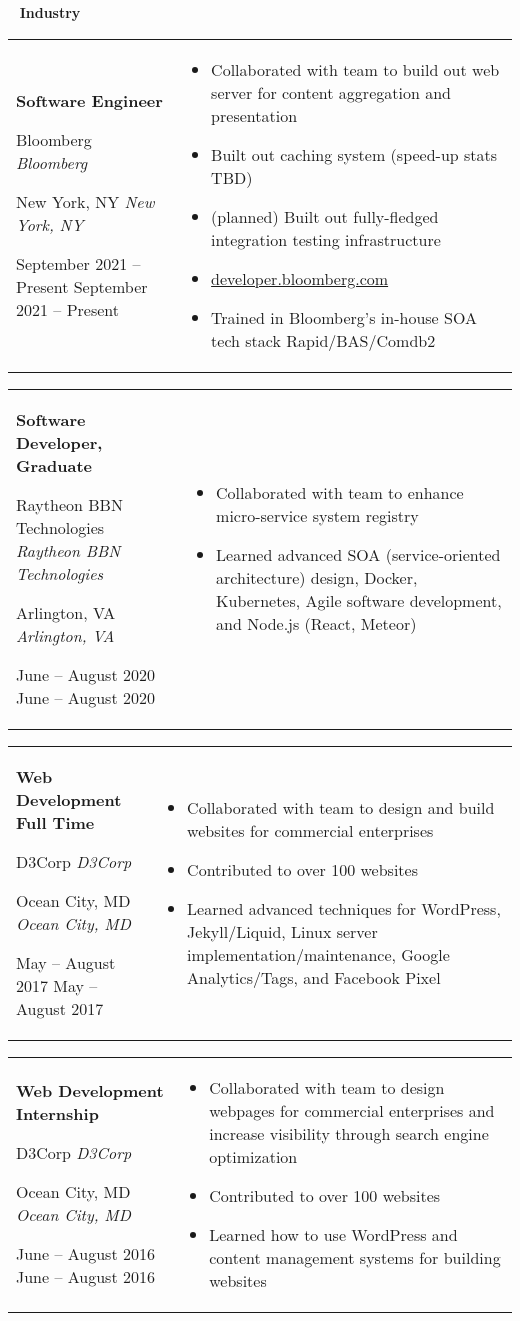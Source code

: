 \documentclass[11pt,letterpaper]{article}
\newcommand{\sect}[1]{
\begin{center}
	\noindent\xrfill[0.7ex]{0.5pt} \mbox{ } {\Large \bf #1} \mbox{ } \xrfill[0.7ex]{0.5pt}
\end{center}
}
\newcommand{\entry}[5]{
	\noindent
	\begin{tabular}{p{2in} p{\dimexpr \linewidth-2\tabcolsep-2.25in}} %
		\noindent \textbf{#1}
		
		\ifx #2  \else \noindent \textit{#2} \fi
		
		\ifx #3  \else \noindent \textit{#3} \fi
		
		\ifx #4  \else \noindent #4 \fi
		&
		#5
	\end{tabular}
	\vspace{0.5cm}
}
\begin{document}
	\pagebreak
	\sect{Industry}
	
	\entry{Software Engineer}{Bloomberg}{New York, NY}{September 2021 -- Present}{
		\vspace{-5mm}
		\begin{itemize}[itemsep=0pt, wide]
			\item Collaborated with team to build out web server for content aggregation and presentation
			\item Built out caching system (speed-up stats TBD)
			\item (planned) Built out fully-fledged integration testing infrastructure
			\item \url{developer.bloomberg.com}
			\item Trained in Bloomberg's in-house SOA tech stack Rapid/BAS/Comdb2
		\end{itemize}
	}
	
	\entry{Software Developer, Graduate}{Raytheon BBN Technologies}{Arlington, VA}{June -- August 2020}{
		\vspace{-5mm}
		\begin{itemize}[itemsep=0pt, wide]
			\item Collaborated with team to enhance micro-service system registry
			\item Learned advanced SOA (service-oriented architecture) design, Docker, Kubernetes, Agile software development, and Node.js (React, Meteor)
		\end{itemize}
	}
	
	\entry{Web Development Full Time}{D3Corp}{Ocean City, MD}{May -- August 2017}{
		\vspace{-5mm}
		\begin{itemize}[itemsep=0pt, wide]
			\item Collaborated with team to design and build websites for commercial enterprises
			\item Contributed to over 100 websites
			\item Learned advanced techniques for WordPress, Jekyll/Liquid, Linux server implementation/maintenance, Google Analytics/Tags, and Facebook Pixel
		\end{itemize}
	}
	
	\entry{Web Development Internship}{D3Corp}{Ocean City, MD}{June -- August 2016}{
		\vspace{-5mm}
		\begin{itemize}[itemsep=0pt, wide]
			\item Collaborated with team to design webpages for commercial enterprises and increase visibility through search engine optimization
			\item Contributed to over 100 websites
			\item Learned how to use WordPress and content management systems for building websites
		\end{itemize}
	}
	
\end{document}
